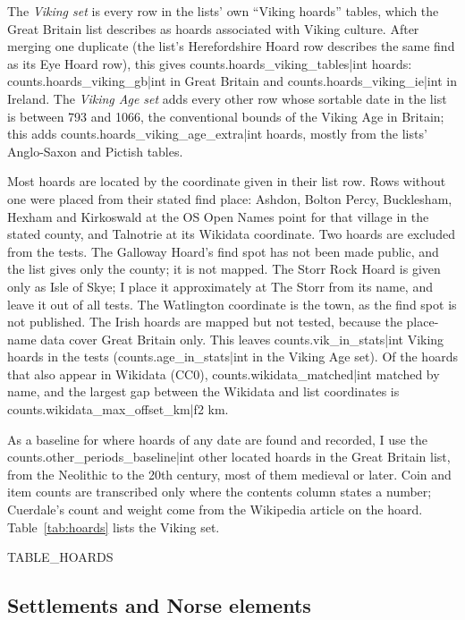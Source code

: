 \documentclass[11pt,a4paper]{article}
\begin{document}
The \textit{Viking set} is every row in the lists' own ``Viking hoards'' tables, which the Great Britain list describes as hoards associated with Viking culture. After merging one duplicate (the list's Herefordshire Hoard row describes the same find as its Eye Hoard row), this gives {{counts.hoards_viking_tables|int}} hoards: {{counts.hoards_viking_gb|int}} in Great Britain and {{counts.hoards_viking_ie|int}} in Ireland. The \textit{Viking Age set} adds every other row whose sortable date in the list is between 793 and 1066, the conventional bounds of the Viking Age in Britain; this adds {{counts.hoards_viking_age_extra|int}} hoards, mostly from the lists' Anglo-Saxon and Pictish tables.

Most hoards are located by the coordinate given in their list row. Rows without one were placed from their stated find place: Ashdon, Bolton Percy, Bucklesham, Hexham and Kirkoswald at the OS Open Names point for that village in the stated county, and Talnotrie at its Wikidata coordinate. Two hoards are excluded from the tests. The Galloway Hoard's find spot has not been made public, and the list gives only the county; it is not mapped. The Storr Rock Hoard is given only as Isle of Skye; I place it approximately at The Storr from its name, and leave it out of all tests. The Watlington coordinate is the town, as the find spot is not published. The Irish hoards are mapped but not tested, because the place-name data cover Great Britain only. This leaves {{counts.vik_in_stats|int}} Viking hoards in the tests ({{counts.age_in_stats|int}} in the Viking Age set). Of the hoards that also appear in Wikidata (CC0), {{counts.wikidata_matched|int}} matched by name, and the largest gap between the Wikidata and list coordinates is {{counts.wikidata_max_offset_km|f2}} km.

As a baseline for where hoards of any date are found and recorded, I use the {{counts.other_periods_baseline|int}} other located hoards in the Great Britain list, from the Neolithic to the 20th century, most of them medieval or later. Coin and item counts are transcribed only where the contents column states a number; Cuerdale's count and weight come from the Wikipedia article on the hoard. Table~\ref{tab:hoards} lists the Viking set.

{{TABLE_HOARDS}}

\subsection{Settlements and Norse elements}
\end{document}
